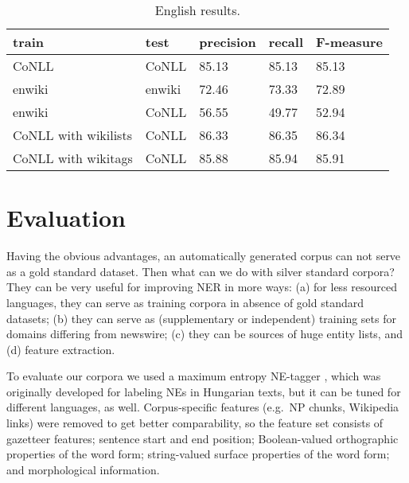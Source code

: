\documentclass[11pt]{article}
\begin{document}
\begin{table*}[ht]
\begin{center}
\begin{tabular}{lllll}
\hline \bf train & \bf test & \bf precision & \bf recall & \bf F-measure \\ \hline
CoNLL & CoNLL & 85.13 & 85.13 & 85.13 \\
enwiki & enwiki & 72.46 & 73.33 &  72.89 \\
enwiki & CoNLL & 56.55 & 49.77 & 52.94 \\
CoNLL with wikilists & CoNLL & 86.33 & 86.35 & 86.34 \\
CoNLL with wikitags & CoNLL & 85.88 & 85.94 & 85.91 \\
\hline
\end{tabular}
\end{center}
\caption{\label{enresults} English results.}
\end{table*}

\section{Evaluation}
\label{sec:eval}

Having the obvious advantages, an automatically generated corpus can not serve as a gold standard dataset. Then what can we do with silver standard corpora? They can be very useful for improving NER in more ways: (a) for less resourced languages, they can serve as training corpora in absence of gold standard datasets; (b) they can serve as (supplementary or independent) training sets for domains differing from newswire; (c) they can be sources of huge entity lists, and (d) feature extraction. 

To evaluate our corpora we used a maximum entropy NE-tagger \cite{Varga:07}, which was originally developed for labeling NEs in Hungarian texts, but it can be tuned for different languages, as well. Corpus-specific features (e.g.~NP chunks, Wikipedia links) were removed to get better comparability, so the feature set consists of gazetteer features; sentence start and end position; Boolean-valued orthographic properties of the word form; string-valued surface properties of the word form; and morphological information.

\end{document}
